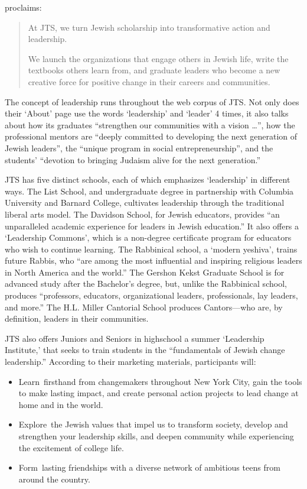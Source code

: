  proclaims:

\begin{quote}

At JTS, we turn Jewish scholarship into transformative action and leadership.

We launch the organizations that engage others in Jewish life, write the textbooks others learn from, and graduate leaders who become a new creative force for positive change in their careers and communities.
\end{quote}

The concept of leadership runs throughout the web corpus of JTS. Not only does their `About' page use the words `leadership' and `leader' 4 times, it also talks about how its graduates ``strengthen our communities with a vision {\ldots}'', how the professional mentors are ``deeply committed to developing the next generation of Jewish leaders'', the ``unique program in social entrepreneurship'', and the students' ``devotion to bringing Judaism alive for the next generation.''

JTS has five distinct schools, each of which emphasizes `leadership' in different ways. The List School, and undergraduate degree in partnership with Columbia University and Barnard College, cultivates leadership through the traditional liberal arts model. The Davidson School, for Jewish educators, provides ``an unparalleled academic experience for leaders in Jewish education.'' It also offers a `Leadership Commons', which is a non-degree certificate program for educators who wish to continue learning. The Rabbinical school, a `modern yeshiva', trains future Rabbis, who ``are among the most influential and inspiring religious leaders in North America and the world.'' The Gershon Kekst Graduate School is for advanced study after the Bachelor's degree, but, unlike the Rabbinical school, produces ``professors, educators, organizational leaders, professionals, lay leaders, and more.'' The H.L. Miller Cantorial School produces Cantors---who are, by definition, leaders in their communities.

JTS also offers Juniors and Seniors in highschool a summer `Leadership Institute,' that seeks to train students in the ``fundamentals of Jewish change leadership.'' According to their marketing materials, participants will:

\begin{itemize}
\item Learn firsthand from changemakers throughout New York City, gain the tools to make lasting impact, and create personal action projects to lead change at home and in the world.

\item Explore the Jewish values that impel us to transform society, develop and strengthen your leadership skills, and deepen community while experiencing the excitement of college life.

\item Form lasting friendships with a diverse network of ambitious teens from around the country.

\end{itemize}

